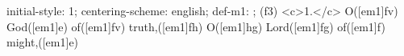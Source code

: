 initial-style: 1;
centering-scheme: english;
def-m1: \grealign;
(f3) <c>1.</c> O([em1]fv) God([em1]e) of([em1]fv) truth,([em1]fh) O([em1]hg) Lord([em1]fg) of([em1]f) might,([em1]e)